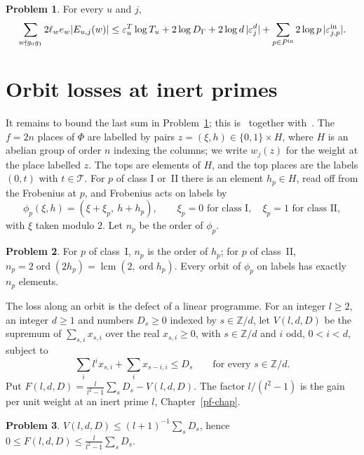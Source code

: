 \documentclass[reqno]{amsart}
\newcounter{chap}
\theoremstyle{definition}
\newtheorem{problem}{Problem}[section]
\theoremstyle{plain}
\theoremstyle{remark}
\newcommand{\Z}{\mathbb Z}
\newcommand{\Tc}{\mathcal T}
\begin{document}
\begin{problem}\label{pr:off-level}
For every \(u\) and \(j\),
\[
 \sum_{w\nmid g_0g_1}2\ell_we_w\lvert E_{u,j}(w)\rvert\le
 \varepsilon^T_u\log T_u+2\log D_\Gamma+2\log d\,\lvert\varepsilon^d_j\rvert+\sum_{p\in P^{\rm in}}2\log p\,\lvert\varepsilon^{\rm in}_{j,p}\rvert .
\]
\end{problem}

\section{Orbit losses at inert primes}\label{sec:orbits}

It remains to bound the last sum in Problem~\ref{pr:off-level}; this is~\cite[Hyp.~16.13]{Adr} together with~\cite[Lemma~16.12]{Adr}.  The \(f=2n\) places of \(\Phi\) are labelled by pairs \(z=(\xi,h)\in\{0,1\}\times H\), where \(H\) is an abelian group of order \(n\) indexing the columns; we write \(w_j(z)\) for the weight at the place labelled \(z\).  The tops are elements of \(H\), and the top places are the labels \((0,t)\) with \(t\in\Tc\).  For \(p\) of class I or~II there is an element \(h_p\in H\), read off from the Frobenius at \(p\), and Frobenius acts on labels by
\[
 \phi_p(\xi,h)=(\xi+\xi_p,\ h+h_p),\qquad \xi_p=0\text{ for class I},\quad \xi_p=1\text{ for class II},
\]
with \(\xi\) taken modulo \(2\).  Let \(n_p\) be the order of \(\phi_p\).

\begin{problem}\label{pr:orbit-length}
For \(p\) of class~I, \(n_p\) is the order of \(h_p\); for \(p\) of class~II, \(n_p=2\operatorname{ord}(2h_p)=\operatorname{lcm}(2,\operatorname{ord}h_p)\).  Every orbit of \(\phi_p\) on labels has exactly \(n_p\) elements.
\end{problem}

The loss along an orbit is the defect of a linear programme.  For an integer \(l\ge2\), an integer \(d\ge1\) and numbers \(D_s\ge0\) indexed by \(s\in\Z/d\), let \(V(l,d,D)\) be the supremum of \(\sum_{s,i}x_{s,i}\) over the real \(x_{s,i}\ge0\), with \(s\in\Z/d\) and \(i\) odd, \(0<i<d\), subject to
\[
 \sum_il^ix_{s,i}+\sum_ix_{s-i,i}\le D_s\qquad\text{for every }s\in\Z/d .
\]
Put \(F(l,d,D)=\frac{l}{l^2-1}\sum_sD_s-V(l,d,D)\).  The factor \(l/(l^2-1)\) is the gain per unit weight at an inert prime \(l\), Chapter~\ref{pf-chap}.

\begin{problem}\label{pr:lp-bounds}
\(V(l,d,D)\le(l+1)^{-1}\sum_sD_s\), hence \(0\le F(l,d,D)\le\frac{l}{l^2-1}\sum_sD_s\).
\end{problem}
\end{document}
